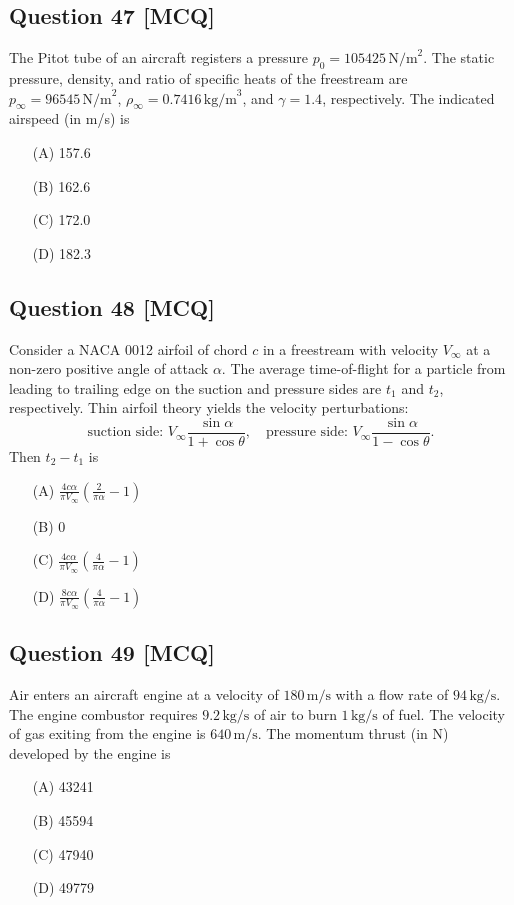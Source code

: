 \documentclass[12pt,a4paper]{article}
\begin{document}
\subsection*{Question 47 [MCQ]}
The Pitot tube of an aircraft registers a pressure \( p_0 = 105425 \, \text{N/m}^2 \). The static pressure, density, and ratio of specific heats of the freestream are \( p_\infty = 96545 \, \text{N/m}^2 \), \( \rho_\infty = 0.7416 \, \text{kg/m}^3 \), and \( \gamma = 1.4 \), respectively. The indicated airspeed (in m/s) is  
\begin{itemize}
\item[(A)] 157.6  
\item[(B)] 162.6  
\item[(C)] 172.0  
\item[(D)] 182.3  
\end{itemize}

\vspace{0.5cm}

\subsection*{Question 48 [MCQ]}
Consider a NACA 0012 airfoil of chord \( c \) in a freestream with velocity \( V_\infty \) at a non-zero positive angle of attack \( \alpha \). The average time-of-flight for a particle from leading to trailing edge on the suction and pressure sides are \( t_1 \) and \( t_2 \), respectively. Thin airfoil theory yields the velocity perturbations:  
\[
\text{suction side: } V_\infty \frac{\sin \alpha}{1 + \cos \theta}, \quad
\text{pressure side: } V_\infty \frac{\sin \alpha}{1 - \cos \theta}.
\]  
Then \( t_2 - t_1 \) is  
\begin{itemize}
\item[(A)] \( \frac{4c\alpha}{\pi V_\infty} \left( \frac{2}{\pi \alpha} - 1 \right) \)  
\item[(B)] 0  
\item[(C)] \( \frac{4c\alpha}{\pi V_\infty} \left( \frac{4}{\pi \alpha} - 1 \right) \)  
\item[(D)] \( \frac{8c\alpha}{\pi V_\infty} \left( \frac{4}{\pi \alpha} - 1 \right) \)  
\end{itemize}

\vspace{0.5cm}

\subsection*{Question 49 [MCQ]}
Air enters an aircraft engine at a velocity of \( 180 \, \text{m/s} \) with a flow rate of \( 94 \, \text{kg/s} \). The engine combustor requires \( 9.2 \, \text{kg/s} \) of air to burn \( 1 \, \text{kg/s} \) of fuel. The velocity of gas exiting from the engine is \( 640 \, \text{m/s} \). The momentum thrust (in N) developed by the engine is  
\begin{itemize}
\item[(A)] 43241  
\item[(B)] 45594  
\item[(C)] 47940  
\item[(D)] 49779  
\end{itemize}
\end{document}
